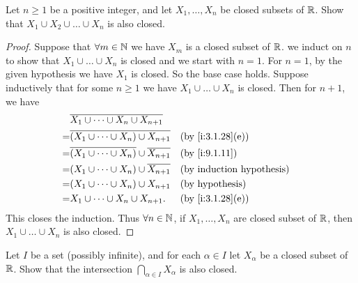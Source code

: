 \begin{ex}\label{i:ex:9.1.7}
  Let \(n \geq 1\) be a positive integer, and let \(X_1, \dots, X_n\) be closed subsets of \(\mathbb{R}\).
  Show that \(X_1 \cup X_2 \cup \dots \cup X_n\) is also closed.
\end{ex}

\begin{proof}
  Suppose that \(\forall m \in \mathbb{N}\) we have \(X_m\) is a closed subset of \(\mathbb{R}\).
  we induct on \(n\) to show that \(X_1 \cup \dots \cup X_n\) is closed and we start with \(n = 1\).
  For \(n = 1\), by the given hypothesis we have \(X_1\) is closed.
  So the base case holds.
  Suppose inductively that for some \(n \geq 1\) we have \(X_1 \cup \dots \cup X_n\) is closed.
  Then for \(n + 1\), we have
  \begin{align*}
      & \overline{X_1 \cup \dots \cup X_n \cup X_{n + 1}}                                          \\
    = & \overline{(X_1 \cup \dots \cup X_n) \cup X_{n + 1}}            &  & \by{i:3.1.28}[e]       \\
    = & \overline{(X_1 \cup \dots \cup X_n)} \cup \overline{X_{n + 1}} &  & \by{i:9.1.11}          \\
    = & (X_1 \cup \dots \cup X_n) \cup \overline{X_{n + 1}}            &  & \byIH                  \\
    = & (X_1 \cup \dots \cup X_n) \cup X_{n + 1}                       &  & \text{(by hypothesis)} \\
    = & X_1 \cup \dots \cup X_n \cup X_{n + 1}.                        &  & \by{i:3.1.28}[e]
  \end{align*}
  This closes the induction.
  Thus \(\forall n \in \mathbb{N}\), if \(X_1, \dots, X_n\) are closed subset of \(\mathbb{R}\), then \(X_1 \cup \dots \cup X_n\) is also closed.
\end{proof}

\begin{ex}\label{i:ex:9.1.8}
  Let \(I\) be a set (possibly infinite), and for each \(\alpha \in I\) let \(X_{\alpha}\) be a closed subset of \(\mathbb{R}\).
  Show that the intersection \(\bigcap_{\alpha \in I} X_{\alpha}\) is also closed.
\end{ex}

